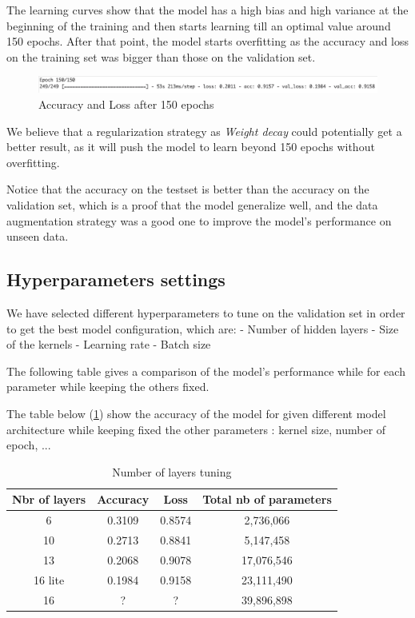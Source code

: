 \documentclass[a4paper]{article}
\begin{document}
The learning curves show that the model has a high bias and high variance at the beginning of the training and then starts learning till an optimal value around 150 epochs. After that point, the model starts overfitting as the accuracy and loss on the training set was bigger than those on the validation set.


\begin{figure}[h!]
	\centering
	\includegraphics[scale=.5]{150epoch.png}
	\caption{Accuracy and Loss after 150 epochs}
	\label{fig:150epoch}
\end{figure}


We believe that a regularization strategy as \textit{Weight decay} could potentially get a better result, as it will push the model to learn beyond 150 epochs without overfitting.

Notice that the accuracy on the testset is better than the accuracy on the validation set, which is a proof that the model generalize well, and the data augmentation strategy was a good one to improve the model's performance on unseen data.

\subsection{Hyperparameters settings}
We have selected different hyperparameters to tune on the validation set in order to get the best model configuration, which are:
- Number of hidden layers
- Size of the kernels
- Learning rate
- Batch size

The following table gives a comparison of the model's performance while for each parameter while keeping the others fixed.

The table below (\ref{table:1}) show the accuracy of the model for given different model architecture while keeping fixed the other parameters : kernel size, number of epoch, ...

\begin{table}[h!]
	\centering
	\begin{tabular}{||c c c c||} 
		\hline
		Nbr of layers & Accuracy & Loss & Total nb of parameters\\ [0.5ex] 
		\hline\hline
		6 & 0.3109 & 0.8574 & 2,736,066\\ 
		10 & 0.2713 & 0.8841 & 5,147,458\\ 
		13 & 0.2068 & 0.9078 & 17,076,546\\ 
		16 lite & 0.1984 & 0.9158 & 23,111,490\\ 
		16 & ? & ? & 39,896,898\\  [1ex] 
		\hline
	\end{tabular}
	\caption{Number of layers tuning}
	\label{table:1}
\end{table}
\end{document}

